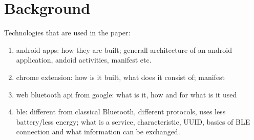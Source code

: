 \section{Background}
\label{background}
Technologies that are used in the paper:
\begin{enumerate}
\item android apps: how they are built; generall architecture of an android application, andoid activities, manifest etc.
\item chrome extension: how is it built, what does it consist of; manifest
\item web bluetooth api from google: what is it, how and for what is it used
\item ble: different from classical Bluetooth, different protocols, uses less battery/less energy; what is a service, characteristic, UUID, basics of BLE connection and what information can be exchanged.
\end{enumerate}

